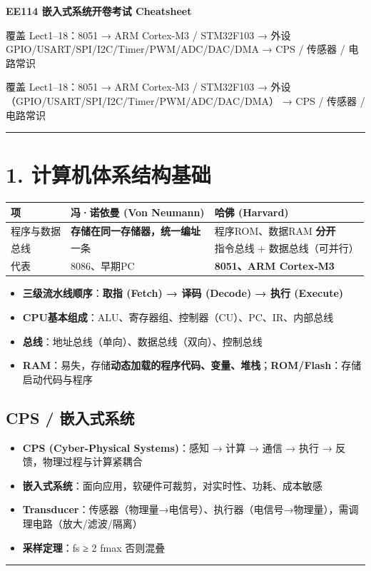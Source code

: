 \documentclass[UTF8,zihao=-5]{ctexart}
\renewcommand{\arraystretch}{0.9}
\newcommand{\hint}[1]{{\color{gray!35!black}\footnotesize #1}}
\begin{document}
\fontsize{7.8pt}{8.7pt}\selectfont
\begin{center}
{\bfseries\Large EE114 嵌入式系统开卷考试 Cheatsheet}\par
{\scriptsize 覆盖 Lect1--18：8051 → ARM Cortex-M3 / STM32F103 → 外设 GPIO/USART/SPI/I2C/Timer/PWM/ADC/DAC/DMA → CPS / 传感器 / 电路常识}\par
\end{center}
\vspace{-5pt}
\begin{multicols*}{2}
\hint{覆盖 Lect1–18：8051 → ARM Cortex‑M3 / STM32F103 → 外设（GPIO/USART/SPI/I2C/Timer/PWM/ADC/DAC/DMA） → CPS / 传感器 / 电路常识}\par
\vspace{1pt}\hrule\vspace{1pt}
\section*{1. 计算机体系结构基础}
{\scriptsize\setlength{\tabcolsep}{1.8pt}\renewcommand{\arraystretch}{0.88}%
\begin{tabularx}{\linewidth}{@{}*{3}{Y}@{}}
\toprule
\textbf{项} & \textbf{冯·诺依曼 (Von Neumann)} & \textbf{哈佛 (Harvard)} \\
\midrule
程序与数据 & \textbf{存储在同一存储器，统一编址} & 程序ROM、数据RAM \textbf{分开} \\
总线 & 一条 & 指令总线 + 数据总线（可并行） \\
代表 & 8086、早期PC & \textbf{8051、ARM Cortex‑M3} \\
\bottomrule
\end{tabularx}}
\begin{itemize}
\item \textbf{三级流水线顺序}：\textbf{取指 (Fetch) → 译码 (Decode) → 执行 (Execute)}
\item \textbf{CPU基本组成}：ALU、寄存器组、控制器（CU）、PC、IR、内部总线
\item \textbf{总线}：地址总线（单向）、数据总线（双向）、控制总线
\item \textbf{RAM}：易失，存储\textbf{动态加载的程序代码、变量、堆栈}；\textbf{ROM/Flash}：存储启动代码与程序
\end{itemize}
\subsection*{CPS / 嵌入式系统}
\begin{itemize}
\item \textbf{CPS (Cyber‑Physical Systems)}：感知 → 计算 → 通信 → 执行 → 反馈，物理过程与计算紧耦合
\item \textbf{嵌入式系统}：面向应用，软硬件可裁剪，对实时性、功耗、成本敏感
\item \textbf{Transducer}：传感器（物理量→电信号）、执行器（电信号→物理量），需调理电路（放大/滤波/隔离）
\item \textbf{采样定理}：fs ≥ 2 fmax 否则混叠
\end{itemize}
\vspace{1pt}\hrule\vspace{1pt}

\end{multicols*}
\end{document}
